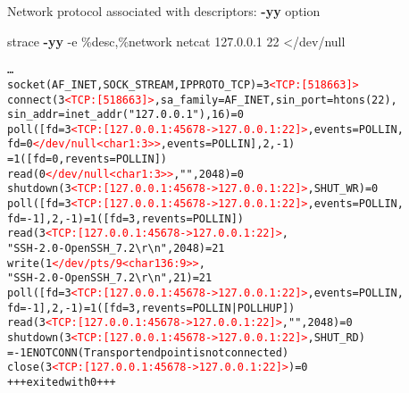 \documentclass[unicode]{beamer}
\begin{document}
\begin{frame}[fragile]{Network protocol associated with descriptors: \textbf{-yy} option}
\begin{block}{\large strace \textbf{-yy} -e \%desc,\%network netcat 127.0.0.1 22 </dev/null}
\scriptsize
\begin{alltt}
\ldots
socket(AF_INET, SOCK_STREAM, IPPROTO_TCP) = 3\textcolor{red}{<TCP:[518663]>}
connect(3\textcolor{red}{<TCP:[518663]>}, {sa_family=AF_INET, sin_port=htons(22),
        sin_addr=inet_addr("127.0.0.1")}, 16) = 0
poll([{fd=3\textcolor{red}{<TCP:[127.0.0.1:45678->127.0.0.1:22]>}, events=POLLIN},
     {fd=0\textcolor{red}{</dev/null<char 1:3>>}, events=POLLIN}], 2, -1)
     = 1 ([{fd=0, revents=POLLIN}])
read(0\textcolor{red}{</dev/null<char 1:3>>}, "", 2048)  = 0
shutdown(3\textcolor{red}{<TCP:[127.0.0.1:45678->127.0.0.1:22]>}, SHUT_WR) = 0
poll([{fd=3\textcolor{red}{<TCP:[127.0.0.1:45678->127.0.0.1:22]>}, events=POLLIN},
     {fd=-1}], 2, -1) = 1 ([{fd=3, revents=POLLIN}])
read(3\textcolor{red}{<TCP:[127.0.0.1:45678->127.0.0.1:22]>},
     "SSH-2.0-OpenSSH_7.2{\textbackslash}r{\textbackslash}n", 2048) = 21
write(1\textcolor{red}{</dev/pts/9<char 136:9>>},
      "SSH-2.0-OpenSSH_7.2{\textbackslash}r{\textbackslash}n", 21) = 21
poll([{fd=3\textcolor{red}{<TCP:[127.0.0.1:45678->127.0.0.1:22]>}, events=POLLIN},
     {fd=-1}], 2, -1) = 1 ([{fd=3, revents=POLLIN|POLLHUP}])
read(3\textcolor{red}{<TCP:[127.0.0.1:45678->127.0.0.1:22]>}, "", 2048) = 0
shutdown(3\textcolor{red}{<TCP:[127.0.0.1:45678->127.0.0.1:22]>}, SHUT_RD)
         = -1 ENOTCONN (Transport endpoint is not connected)
close(3\textcolor{red}{<TCP:[127.0.0.1:45678->127.0.0.1:22]>}) = 0
+++ exited with 0 +++
\end{alltt}
\end{block}
\end{frame}
\end{document}
